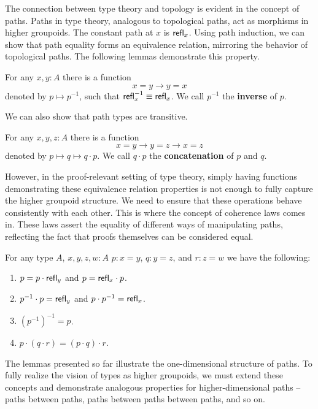 \documentclass[main.tex]{subfiles}
\begin{document}
The connection between type theory and topology is evident in the concept of paths. Paths in type theory, analogous to topological paths, act as morphisms in higher groupoids. The constant path at $x$ is $\mathsf{refl}_{x}$. Using path induction, we can show that path equality forms an equivalence relation, mirroring the behavior of topological paths. The following lemmas demonstrate this property.

\begin{lemma}
    For any $x,y : A$ there is a function
    $$x = y \to y = x$$
    denoted by $p \mapsto p^{-1}$, such that $\mathsf{refl}_{x}^{-1} \equiv \mathsf{refl}_{x}$. We call $p^{-1}$ the \textbf{inverse} of $p$.
\end{lemma}
We can also show that path types are transitive.
\begin{lemma}
    For any $x,y,z : A$ there is a function
    $$x = y \to y = z \to x = z$$
    denoted by $p \mapsto q \mapsto q \cdot p$. We call $q \cdot p$ the \textbf{concatenation} of $p$ and $q$.
\end{lemma}
However, in the proof-relevant setting of type theory, simply having functions demonstrating these equivalence relation properties is not enough to fully capture the higher groupoid structure. We need to ensure that these operations behave consistently with each other. This is where the concept of coherence laws comes in. These laws assert the equality of different ways of manipulating paths, reflecting the fact that proofs themselves can be considered equal.

\begin{lemma}
    For any type $A$, $x,y,z,w : A$ $p : x =y$, $q : y = z$, and $r : z = w$ we have the following:
    \begin{enumerate}
        \item $p = p \cdot \mathsf{refl}_{y}$ and $p = \mathsf{refl}_{x} \cdot p$.
        \item $p^{-1} \cdot p = \mathsf{refl}_{y}$ and $p \cdot p^{-1} = \mathsf{refl}_{x}$.
        \item $(p^{-1})^{-1} = p$.
        \item $p \cdot (q \cdot r) = (p \cdot q) \cdot r$.
    \end{enumerate}
\end{lemma}
The lemmas presented so far illustrate the one-dimensional structure of paths. To fully realize the vision of types as higher groupoids, we must extend these concepts and demonstrate analogous properties for higher-dimensional paths – paths between paths, paths between paths between paths, and so on.
\end{document}
